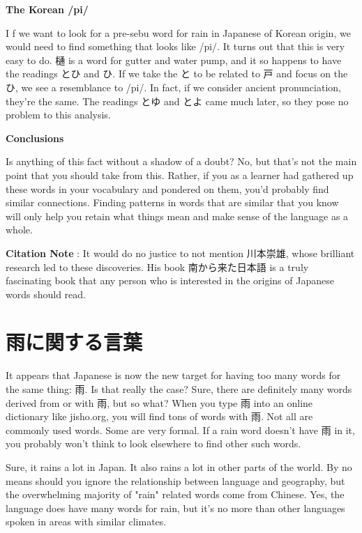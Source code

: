 \begin{center}
 \textbf{The Korean \slash pi\slash  } 
\end{center}

\par{ I f we want to look for a pre-sebu word for rain in Japanese of Korean origin, we would need to find something that looks like \slash pi\slash . It turns out that this is very easy to do. 樋 is a word for gutter and water pump, and it so happens to have the readings とひ and ひ. If we take the と to be related to 戸 and focus on the ひ, we see a resemblance to \slash pi\slash . In fact, if we consider ancient pronunciation, they're the same. The readings とゆ and とよ came much later, so they pose no problem to this analysis. }

\begin{center}
 \textbf{Conclusions }
\end{center}

\par{ Is anything of this fact without a shadow of a doubt? No, but that's not the main point that you should take from this. Rather, if you as a learner had gathered up these words in your vocabulary and pondered on them, you'd probably find similar connections. Finding patterns in words that are similar that you know will only help you retain what things mean and make sense of the language as a whole. }

\par{\textbf{Citation Note }: It would do no justice to not mention 川本崇雄, whose brilliant research led to these discoveries. His book 南から来た日本語 is a truly fascinating book that any person who is interested in the origins of Japanese words should read. }
      
\section{雨に関する言葉}
 
\par{ It appears that Japanese is now the new target for having too many words for the same thing: 雨. Is that really the case? Sure, there are definitely many words derived from or with 雨, but so what? When you type 雨 into an online dictionary like jisho.org, you will find tons of words with 雨. Not all are commonly used words. Some are very formal. If a rain word doesn't have 雨 in it, you probably won't think to look elsewhere to find other such words. }

\par{ Sure, it rains a lot in Japan. It also rains a lot in other parts of the world. By no means should you ignore the relationship between language and geography, but the overwhelming majority of "rain" related words come from Chinese. Yes, the language does have many words for rain, but it's no more than other languages spoken in areas with similar climates. }

